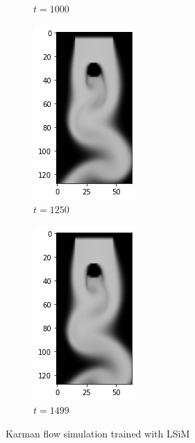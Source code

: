 \documentclass[a4paper,12pt,twoside]{report}
\begin{document}
\begin{figure}
\begin{subfigure}{0.18\textwidth}
		\caption{$t=1000$}
	\end{subfigure}
	\begin{subfigure}{0.18\textwidth}
		\centering
		\includegraphics[scale=0.5]{karmanflow/lsim_density_001250.png}
		\caption{$t=1250$}
	\end{subfigure}
	\begin{subfigure}{0.18\textwidth}
		\centering
		\includegraphics[scale=0.5]{karmanflow/lsim_density_001499.png}
		\caption{$t=1499$}
	\end{subfigure}
	\caption{Karman flow simulation trained with LSiM}
	\label{sol karman high lsim}
\end{figure}
\end{document}
